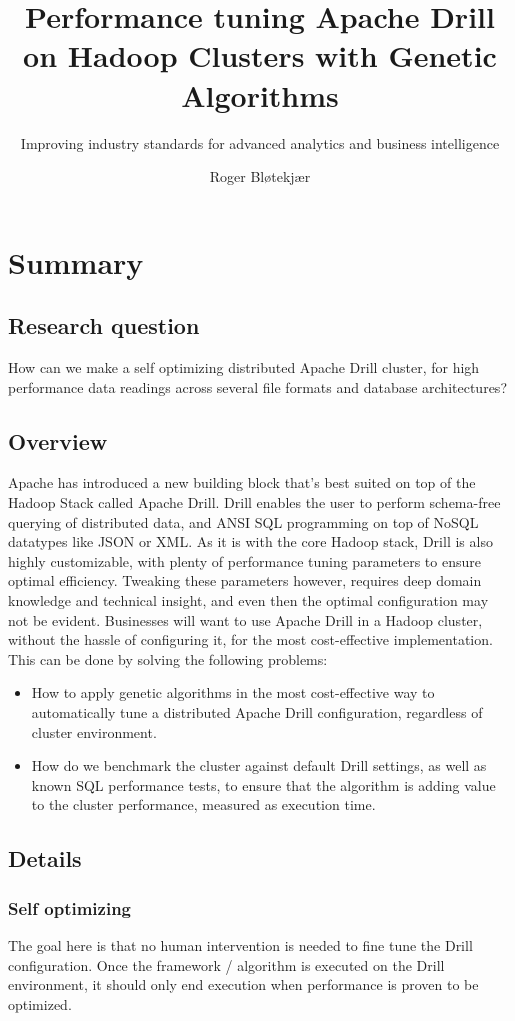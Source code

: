\documentclass[a4paper,english]{report}
\title{Performance tuning Apache Drill on Hadoop Clusters with Genetic Algorithms}
\subtitle{Improving industry standards for advanced analytics and business intelligence}
\author{Roger Bløtekjær}
\begin{document}
	\duoforside[dept={Institutt for informatikk},
	program={Informatikk: språkteknologi},
	short]
	\section{Summary}
		\subsection{Research question}
		How can we make a self optimizing distributed Apache Drill cluster, for high performance data readings across several file formats and database architectures?
		\subsection{Overview}
		Apache has introduced a new building block that's best suited on top of the Hadoop Stack called Apache Drill. Drill enables the user to perform schema-free querying of distributed data, and ANSI SQL programming on top of NoSQL datatypes like JSON or XML. As it is with the core Hadoop stack, Drill is also highly customizable, with plenty of performance tuning parameters to ensure optimal efficiency. Tweaking these parameters however, requires deep domain knowledge and technical insight, and even then the optimal configuration may not be evident. Businesses will want to use Apache Drill in a Hadoop cluster, without the hassle of configuring it, for the most cost-effective implementation. This can be done by solving the following problems:
		\begin{itemize}
			\item How to apply genetic algorithms in the most cost-effective way to automatically tune a distributed Apache Drill configuration, regardless of cluster environment.
			\item How do we benchmark the cluster against default Drill settings, as well as known SQL performance tests, to ensure that the algorithm is adding value to the cluster performance, measured as execution time.
		\end{itemize}
		\subsection{Details}
			\subsubsection{Self optimizing}
			The goal here is that no human intervention is needed to fine tune the Drill configuration. Once the framework / algorithm is executed on the Drill environment, it should only end execution when performance is proven to be optimized.
\end{document}
